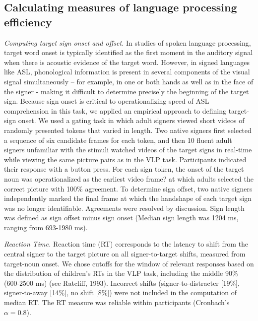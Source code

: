 \documentclass[oneside]{report}
\begin{document}
\hypertarget{calculating-measures-of-language-processing-efficiency}{%
\subsection{Calculating measures of language processing
efficiency}\label{calculating-measures-of-language-processing-efficiency}}

\emph{Computing target sign onset and offset.} In studies of spoken
language processing, target word onset is typically identified as the
first moment in the auditory signal when there is acoustic evidence of
the target word. However, in signed languages like ASL, phonological
information is present in several components of the visual signal
simultaneously -- for example, in one or both hands as well as in the
face of the signer - making it difficult to determine precisely the
beginning of the target sign. Because sign onset is critical to
operationalizing speed of ASL comprehension in this task, we applied an
empirical approach to defining target-sign onset. We used a gating task
in which adult signers viewed short videos of randomly presented tokens
that varied in length. Two native signers first selected a sequence of
six candidate frames for each token, and then 10 fluent adult signers
unfamiliar with the stimuli watched videos of the target signs in
real-time while viewing the same picture pairs as in the VLP task.
Participants indicated their response with a button press. For each sign
token, the onset of the target noun was operationalized as the earliest
video frame? at which adults selected the correct picture with 100\%
agreement. To determine sign offset, two native signers independently
marked the final frame at which the handshape of each target sign was no
longer identifiable. Agreements were resolved by discussion. Sign length
was defined as sign offset minus sign onset (Median sign length was 1204
ms, ranging from 693-1980 ms).

\emph{Reaction Time.} Reaction time (RT) corresponds to the latency to
shift from the central signer to the target picture on all
signer-to-target shifts, measured from target-noun onset. We chose
cutoffs for the window of relevant responses based on the distribution
of children's RTs in the VLP task, including the middle 90\% (600-2500
ms) (see Ratcliff, 1993). Incorrect shifts (signer-to-distracter
{[}19\%{]}, signer-to-away {[}14\%{]}, no shift {[}8\%{]}) were not
included in the computation of median RT. The RT measure was reliable
within participants (Cronbach's \(\alpha = 0.8\)).
\end{document}
